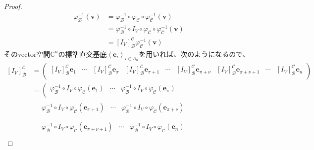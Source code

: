 \documentclass[dvipdfmx]{jsarticle}
\begin{document}
\begin{proof}
\begin{align*}
\varphi_{\mathcal{B}}^{- 1}\left( \mathbf{v} \right) &= \varphi_{\mathcal{B}}^{- 1} \circ \varphi_{\mathcal{C}} \circ \varphi_{\mathcal{C}}^{- 1}\left( \mathbf{v} \right)\\
&= \varphi_{\mathcal{B}}^{- 1} \circ I_{V} \circ \varphi_{\mathcal{C}} \circ \varphi_{\mathcal{C}}^{- 1}\left( \mathbf{v} \right)\\
&= \left[ I_{V} \right]_{\mathcal{B}}^{\mathcal{C}}\varphi_{\mathcal{C}}^{- 1}\left( \mathbf{v} \right)
\end{align*}
そのvector空間$\mathbb{C}^{n}$の標準直交基底$\left\langle \mathbf{e}_{i} \right\rangle_{i \in \varLambda_{n}}$を用いれば、次のようになるので、
\begin{align*}
\left[ I_{V} \right]_{\mathcal{B}}^{\mathcal{C}} &= \begin{pmatrix}
\left[ I_{V} \right]_{\mathcal{B}}^{\mathcal{C}}\mathbf{e}_{1} & \cdots & \left[ I_{V} \right]_{\mathcal{B}}^{\mathcal{C}}\mathbf{e}_{\pi} & \left[ I_{V} \right]_{\mathcal{B}}^{\mathcal{C}}\mathbf{e}_{\pi + 1} & \cdots & \left[ I_{V} \right]_{\mathcal{B}}^{\mathcal{C}}\mathbf{e}_{\pi + \nu} & \left[ I_{V} \right]_{\mathcal{B}}^{\mathcal{C}}\mathbf{e}_{\pi + \nu + 1} & \cdots & \left[ I_{V} \right]_{\mathcal{B}}^{\mathcal{C}}\mathbf{e}_{n} \\
\end{pmatrix}\\
&= \left( \begin{matrix}
\varphi_{\mathcal{B}}^{- 1} \circ I_{V} \circ \varphi_{\mathcal{C}}\left( \mathbf{e}_{1} \right) & \cdots & \varphi_{\mathcal{B}}^{- 1} \circ I_{V} \circ \varphi_{\mathcal{C}}\left( \mathbf{e}_{\pi} \right) \\
\end{matrix} \right.\\
&\quad \begin{matrix}
\varphi_{\mathcal{B}}^{- 1} \circ I_{V} \circ \varphi_{\mathcal{C}}\left( \mathbf{e}_{\pi + 1} \right) & \cdots & \varphi_{\mathcal{B}}^{- 1} \circ I_{V} \circ \varphi_{\mathcal{C}}\left( \mathbf{e}_{\pi + \nu} \right) \\
\end{matrix} \\
&\quad \left. \begin{matrix}
\varphi_{\mathcal{B}}^{- 1} \circ I_{V} \circ \varphi_{\mathcal{C}}\left( \mathbf{e}_{\pi + \nu + 1} \right) & \cdots & \varphi_{\mathcal{B}}^{- 1} \circ I_{V} \circ \varphi_{\mathcal{C}}\left( \mathbf{e}_{n} \right) \\

\end{matrix}
\end{align*}
\end{proof}
\end{document}

